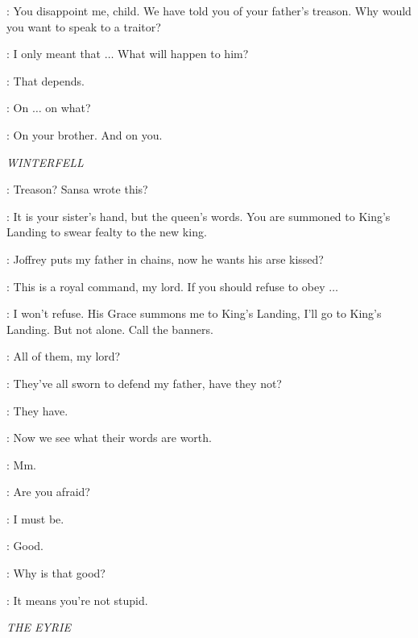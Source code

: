 \CERSEI: You disappoint me, child. We have told you of your father's treason. Why would you want to speak to a traitor? 

\SANSA: I only meant that $\ldots$ What will happen to him? 

\CERSEI: That depends. 

\SANSA: On $\ldots$ on what? 

\CERSEI: On your brother. And on you. 


\scene

\textit{WINTERFELL} 


\ROBB:  Treason? Sansa wrote this? 

\LUWIN: It is your sister's hand, but the queen's words. You are summoned to King's Landing to swear fealty to the new king. 

\ROBB: Joffrey puts my father in chains, now he wants his arse kissed? 

\LUWIN: This is a royal command, my lord. If you should refuse to obey $\ldots$

\ROBB: I won't refuse. His Grace summons me to King's Landing, I'll go to King's Landing. But not alone. Call the banners. 

\LUWIN: All of them, my lord? 

\ROBB: They've all sworn to defend my father, have they not? 

\LUWIN: They have. 

\ROBB: Now we see what their words are worth. 

\LUWIN: Mm.


\THEON: Are you afraid? 


\ROBB: I must be. 

\THEON: Good. 

\ROBB: Why is that good? 

\THEON: It means you're not stupid. 



\scene

\textit{THE EYRIE} 


